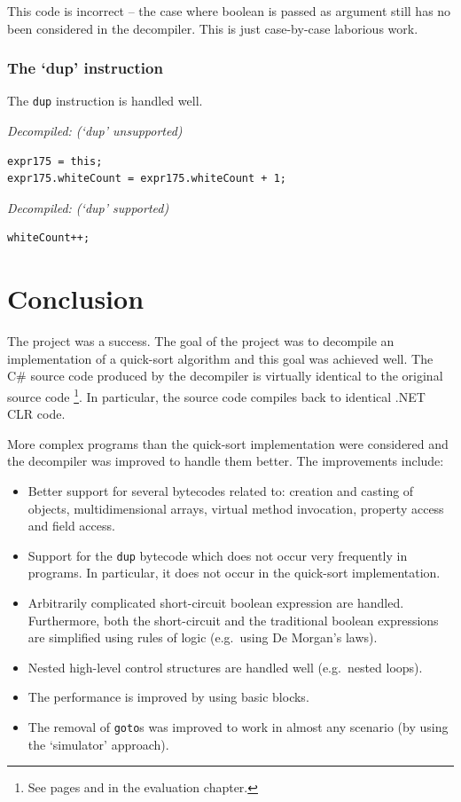 \documentclass[12pt,twoside,notitlepage]{report}
\begin{document}
This code is incorrect -- the case where boolean is
passed as argument still has no been considered in the decompiler.
This is just case-by-case laborious work.



\subsection{The `dup' instruction}

The \verb|dup| instruction is handled well.

\emph{Decompiled: (`dup' unsupported)}
\begin{verbatim}
expr175 = this;
expr175.whiteCount = expr175.whiteCount + 1;
\end{verbatim}

\emph{Decompiled: (`dup' supported)}
\begin{verbatim}
whiteCount++;
\end{verbatim}



\cleardoublepage
\chapter{Conclusion}

The project was a success.
The goal of the project was to decompile an implementation
of a quick-sort algorithm and this goal was achieved well.
The C\# source code produced by the decompiler is
virtually identical to the original source code%
\footnote{See pages \pageref{Original quick-sort} and \pageref{Decompiled quick-sort} in the evaluation chapter.}.
In particular, the source code compiles back to identical .NET CLR code.

More complex programs than the quick-sort implementation 
were considered and the decompiler was improved to handle them better.
The improvements include:
\begin{itemize}
	\item Better support for several bytecodes related to:
	creation and casting of objects, multidimensional arrays,
	virtual method invocation, property access and field access.
	\item Support for the \verb|dup| bytecode which does not
	occur very frequently in programs.  In particular, it does not
	occur in the quick-sort implementation.
	\item Arbitrarily complicated short-circuit boolean expression
	are handled.  Furthermore, both the short-circuit
	and the traditional boolean expressions are simplified
	using rules of logic (e.g.\ using De Morgan's laws).
	\item Nested high-level control structures are handled
	well (e.g.\ nested loops).
	\item The performance is improved by using basic blocks.
	\item The removal of \verb|goto|s was improved to work
	in almost any scenario (by using the `simulator' approach).
\end{itemize}
\end{document}
